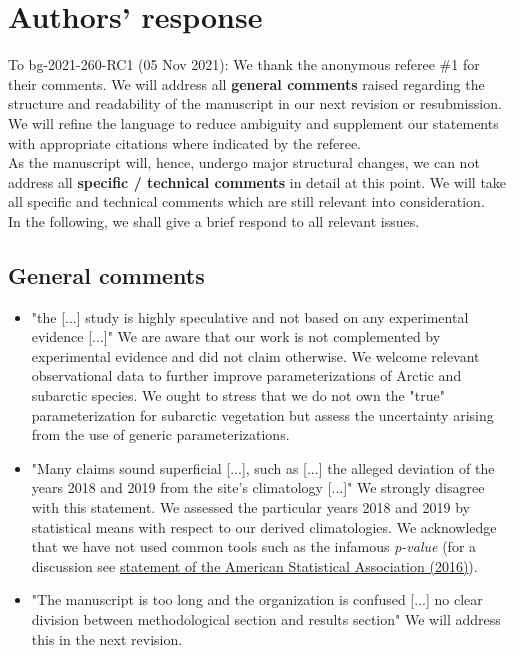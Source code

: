 \documentclass{scrartcl}
\begin{document}
\section*{Authors' response}
To bg-2021-260-RC1 (05 Nov 2021):
We thank the anonymous referee \#1 for their comments.
We will address all \textbf{general comments} raised regarding the structure and readability of the manuscript in our next revision or resubmission. We will refine the language to reduce ambiguity and supplement our statements with appropriate citations where indicated by the referee.\\
As the manuscript will, hence, undergo major structural changes, we can not address all \textbf{specific / technical comments} in detail at this point. We will take all specific and technical comments which are still relevant into consideration.\\
In the following, we shall give a brief respond to all relevant issues.

\subsection*{General comments} 
\begin{itemize}
    
    \item {\color{blue} "the [...] study is highly speculative and not based on any experimental evidence [...]"} We are aware that our work is not complemented by experimental evidence and did not claim otherwise. We welcome relevant observational data to further improve parameterizations of Arctic and subarctic species. We ought to stress that we do not own the "true" parameterization for subarctic vegetation but assess the uncertainty arising from the use of generic parameterizations.
    \item {\color{blue} "Many claims sound superficial [...], such as [...] the alleged deviation of the years 2018 and 2019 from the site's climatology [...]"} We strongly disagree with this statement. We assessed the particular years 2018 and 2019 by statistical means with respect to our derived climatologies. We acknowledge that we have not used common tools such as the infamous \emph{p-value} (for a discussion see \href{https://doi.org/10.1080/00031305.2016.1154108}{statement of the American Statistical Association (2016)}).
    \item {\color{blue} "The manuscript is too long and the organization is confused  [...] no clear division between methodological section and results section"} We will address this in the next revision.

\end{itemize}
\end{document}
